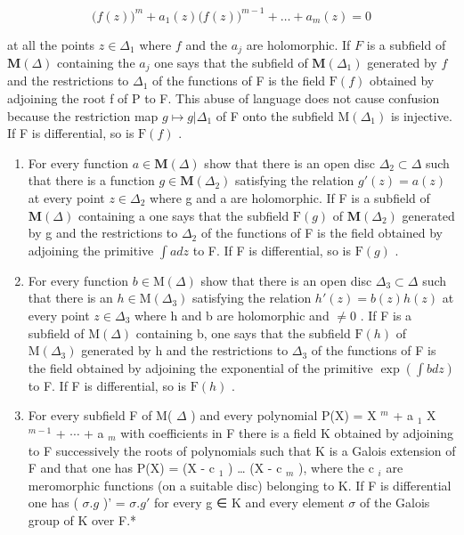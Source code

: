 \[
\Big (f (z) \Big) ^ {m} + a _ {1} (z) \Big (f (z) \Big) ^ {m - 1} + \dots + a _ {m} (z) = 0
\]

at all the points \(z \in \Delta_1\) where \(f\) and the \(a_j\) are holomorphic. If \(F\) is a subfield of \(\mathbf{M}(\Delta)\) containing the \(a_j\) one says that the subfield of \(\mathbf{M}(\Delta_1)\) generated by \(f\) and the restrictions to \(\Delta_{1}\) of the functions of F is the field \(\mathrm{F}(f)\) obtained by adjoining the root f of P to F. This abuse of language does not cause confusion because the restriction map \(g \mapsto g|\Delta_{1}\) of F onto the subfield \(\mathrm{M}(\Delta_{1})\) is injective. If F is differential, so is \(\mathrm{F}(f)\) .

\begin{enumerate}
\def\labelenumi{\alph{enumi})}
\setcounter{enumi}{1}
\item
  For every function \(a \in \mathbf{M}(\Delta)\) show that there is an open disc \(\Delta_{2} \subset \Delta\) such that there is a function \(g \in \mathbf{M}(\Delta_{2})\) satisfying the relation \(g'(z) = a(z)\) at every point \(z \in \Delta_{2}\) where g and a are holomorphic. If F is a subfield of \(\mathbf{M}(\Delta)\) containing a one says that the subfield \(\mathrm{F}(g)\) of \(\mathbf{M}(\Delta_{2})\) generated by g and the restrictions to \(\Delta_{2}\) of the functions of F is the field obtained by adjoining the primitive \(\int a dz\) to F. If F is differential, so is \(\mathrm{F}(g)\) .
\item
  For every function \(b \in \mathrm{M}(\Delta)\) show that there is an open disc \(\Delta_{3} \subset \Delta\) such that there is an \(h \in \mathrm{M}(\Delta_{3})\) satisfying the relation \(h'(z) = b(z)h(z)\) at every point \(z \in \Delta_{3}\) where h and b are holomorphic and \(\neq 0\) . If F is a subfield of \(\mathrm{M}(\Delta)\) containing b, one says that the subfield \(\mathrm{F}(h)\) of \(\mathrm{M}(\Delta_{3})\) generated by h and the restrictions to \(\Delta_{3}\) of the functions of F is the field obtained by adjoining the exponential of the primitive \(\exp\left(\int bdz\right)\) to F. If F is differential, so is \(\mathrm{F}(h)\) .
\item
  For every subfield F of M( \(\Delta\) ) and every polynomial P(X) = X \(^{m}\) + a \(_{1}\) X \(^{m-1}\) + \(\cdots\) + a \(_{m}\) with coefficients in F there is a field K obtained by adjoining to F successively the roots of polynomials such that K is a Galois extension of F and that one has P(X) = (X - c \(_{1}\) ) \ldots{} (X - c \(_{m}\) ), where the c \(_{i}\) are meromorphic functions (on a suitable disc) belonging to K. If F is differential one has ( \(\sigma.g\) )' = \(\sigma.g'\) for every g ∈ K and every element \(\sigma\) of the Galois group of K over F.*
\end{enumerate}

